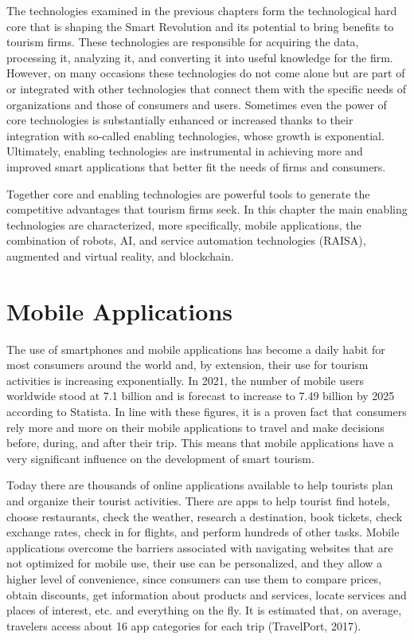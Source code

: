 \documentclass[
  letterpaper,
  DIV=11,
  numbers=noendperiod]{scrreprt}
\begin{document}
The technologies examined in the previous chapters form the
technological hard core that is shaping the Smart Revolution and its
potential to bring benefits to tourism firms. These technologies are
responsible for acquiring the data, processing it, analyzing it, and
converting it into useful knowledge for the firm. However, on many
occasions these technologies do not come alone but are part of or
integrated with other technologies that connect them with the specific
needs of organizations and those of consumers and users. Sometimes even
the power of core technologies is substantially enhanced or increased
thanks to their integration with so-called enabling technologies, whose
growth is exponential. Ultimately, enabling technologies are
instrumental in achieving more and improved smart applications that
better fit the needs of firms and consumers.

Together core and enabling technologies are powerful tools to generate
the competitive advantages that tourism firms seek. In this chapter the
main enabling technologies are characterized, more specifically, mobile
applications, the combination of robots, AI, and service automation
technologies (RAISA), augmented and virtual reality, and blockchain.

\hypertarget{mobile-applications}{%
\section{Mobile Applications}\label{mobile-applications}}

The use of smartphones and mobile applications has become a daily habit
for most consumers around the world and, by extension, their use for
tourism activities is increasing exponentially. In 2021, the number of
mobile users worldwide stood at 7.1 billion and is forecast to increase
to 7.49 billion by 2025 according to Statista. In line with these
figures, it is a proven fact that consumers rely more and more on their
mobile applications to travel and make decisions before, during, and
after their trip. This means that mobile applications have a very
significant influence on the development of smart tourism.

Today there are thousands of online applications available to help
tourists plan and organize their tourist activities. There are apps to
help tourist find hotels, choose restaurants, check the weather,
research a destination, book tickets, check exchange rates, check in for
flights, and perform hundreds of other tasks. Mobile applications
overcome the barriers associated with navigating websites that are not
optimized for mobile use, their use can be personalized, and they allow
a higher level of convenience, since consumers can use them to compare
prices, obtain discounts, get information about products and services,
locate services and places of interest, etc. and everything on the fly.
It is estimated that, on average, travelers access about 16 app
categories for each trip (TravelPort, 2017).
\end{document}
